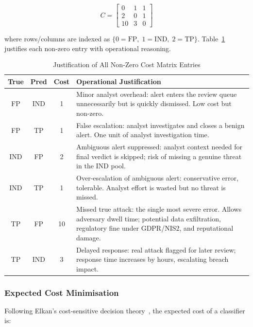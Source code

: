 \documentclass[conference]{IEEEtran}
\begin{document}
\begin{equation}
\label{eq:cost_matrix}
C = \begin{bmatrix}
  0  & 1  & 1 \\
  2  & 0  & 1 \\
  10 & 3  & 0
\end{bmatrix}
\end{equation}

where rows/columns are indexed as $\{0=\text{FP},\; 1=\text{IND},\; 2=\text{TP}\}$.
Table~\ref{tab:cost_justification} justifies each non-zero entry with operational reasoning.

\begin{table}[t]
\centering
\caption{Justification of All Non-Zero Cost Matrix Entries}
\label{tab:cost_justification}
\renewcommand{\arraystretch}{1.1}
\begin{tabular}{c c c p{4.6cm}}
\toprule
\textbf{True} & \textbf{Pred} & \textbf{Cost} & \textbf{Operational Justification} \\
\midrule
FP  & IND & 1  & Minor analyst overhead: alert enters the review queue unnecessarily but is quickly dismissed. Low cost but non-zero. \\
\midrule
FP  & TP  & 1  & False escalation: analyst investigates and closes a benign alert. One unit of analyst investigation time. \\
\midrule
IND & FP  & 2  & Ambiguous alert suppressed: analyst context needed for final verdict is skipped; risk of missing a genuine threat in the IND pool. \\
\midrule
IND & TP  & 1  & Over-escalation of ambiguous alert: conservative error, tolerable. Analyst effort is wasted but no threat is missed. \\
\midrule
TP  & FP  & 10 & Missed true attack: the single most severe error. Allows adversary dwell time; potential data exfiltration, regulatory fine under GDPR/NIS2, and reputational damage. \\
\midrule
TP  & IND & 3  & Delayed response: real attack flagged for later review; response time increases by hours, escalating breach impact. \\
\bottomrule
\end{tabular}
\end{table}

\subsubsection{Expected Cost Minimisation}
Following Elkan's cost-sensitive decision theory~\cite{elkan2001}, the expected cost of a
classifier is:
\end{document}

